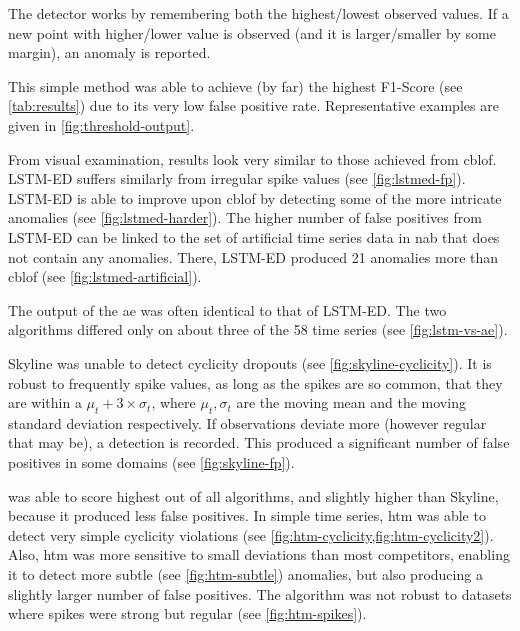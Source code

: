 \begin{description}[style=unboxed,leftmargin=0cm]
    The detector works by remembering both the highest/lowest observed values. If a
    new point with higher/lower value is observed (and it is larger/smaller by some
    margin), an anomaly is reported.

    This simple method was able to achieve (by far) the highest F1-Score (see
    \cref{tab:results}) due to its very low false positive rate. Representative
    examples are given in \cref{fig:threshold-output}.
    \item[LSTM-ED] From visual examination, results look very similar to those
    achieved from \gls{cblof}. LSTM-ED suffers similarly from irregular spike values
     (see \cref{fig:lstmed-fp}). LSTM-ED is able to improve upon \gls{cblof}
    by detecting some of the more intricate anomalies (see \cref{fig:lstmed-harder}).
    The higher number of false positives from LSTM-ED can be linked to the set of
    artificial time series data in \gls{nab} that does not contain any anomalies.
    There, LSTM-ED produced 21 anomalies more than \gls{cblof} (see \cref{fig:lstmed-artificial}).
    \item[Autoencoder] The output of the \gls{ae} was often identical to that of LSTM-ED\@.
    The two algorithms differed only on about three of the 58 time series
    (see \cref{fig:lstm-vs-ae}).
    \item[Skyline] Skyline was unable to detect cyclicity dropouts (see \cref{fig:skyline-cyclicity}).
    It is robust to frequently spike values, as long as the spikes are so common,
    that they are within a \(\mu_t + 3 \times \sigma_t\), where \(\mu_t, \sigma_t\)
    are the moving mean and the moving standard deviation respectively.
    If observations deviate more (however regular that may be), a detection is recorded.
    This produced a significant number of false positives in some domains (see \cref{fig:skyline-fp}).
    \item[Numenta HTM\footnote{\gls{htm} was implemented without the Threshold Detector cheat by Numenta.}]
    was able to score highest out of all algorithms, and slightly higher than
    Skyline, because it produced less false positives. In simple time series,
    \gls{htm} was able to detect very simple cyclicity violations (see
    \cref{fig:htm-cyclicity,fig:htm-cyclicity2}). Also, \gls{htm} was more sensitive
    to small deviations than most competitors, enabling it to detect more subtle
    (see \cref{fig:htm-subtle}) anomalies, but also producing a slightly larger
    number of false positives. The algorithm was not robust to datasets where
    spikes were strong but regular (see \cref{fig:htm-spikes}).
\end{description}


